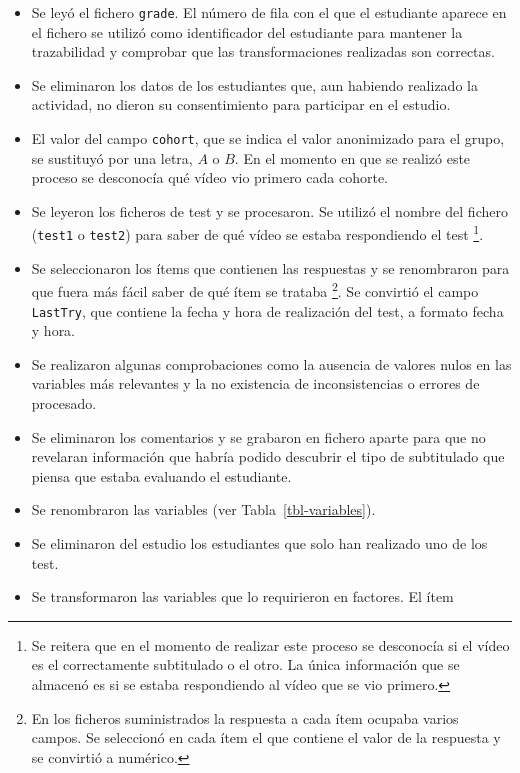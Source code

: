 \documentclass[
  12pt,
  a4paper,
  extrafontsizes,
  onecolumn,
  openright,
  table]{memoir}
\begin{document}
\begin{itemize}
\item
  Se leyó el fichero \texttt{grade}. El número de fila con el que el
  estudiante aparece en el fichero se utilizó como identificador del
  estudiante para mantener la trazabilidad y comprobar que las
  transformaciones realizadas son correctas.
\item
  Se eliminaron los datos de los estudiantes que, aun habiendo realizado
  la actividad, no dieron su consentimiento para participar en el
  estudio.
\item
  El valor del campo \texttt{cohort}, que se indica el valor anonimizado
  para el grupo, se sustituyó por una letra, \(A\) o \(B\). En el
  momento en que se realizó este proceso se desconocía qué vídeo vio
  primero cada cohorte.
\item
  Se leyeron los ficheros de test y se procesaron. Se utilizó el nombre
  del fichero (\texttt{test1} o \texttt{test2}) para saber de qué vídeo
  se estaba respondiendo el test \footnote{Se reitera que en el momento
    de realizar este proceso se desconocía si el vídeo es el
    correctamente subtitulado o el otro. La única información que se
    almacenó es si se estaba respondiendo al vídeo que se vio primero.}.
\item
  Se seleccionaron los ítems que contienen las respuestas y se
  renombraron para que fuera más fácil saber de qué ítem se trataba
  \footnote{En los ficheros suministrados la respuesta a cada ítem
    ocupaba varios campos. Se seleccionó en cada ítem el que contiene el
    valor de la respuesta y se convirtió a numérico.}. Se convirtió el
  campo \texttt{LastTry}, que contiene la fecha y hora de realización
  del test, a formato fecha y hora.
\item
  Se realizaron algunas comprobaciones como la ausencia de valores nulos
  en las variables más relevantes y la no existencia de inconsistencias
  o errores de procesado.
\item
  Se eliminaron los comentarios y se grabaron en fichero aparte para que
  no revelaran información que habría podido descubrir el tipo de
  subtitulado que piensa que estaba evaluando el estudiante.
\item
  Se renombraron las variables (ver Tabla~\ref{tbl-variables}).
\item
  Se eliminaron del estudio los estudiantes que solo han realizado uno
  de los test.
\item
  Se transformaron las variables que lo requirieron en factores. El ítem

\end{itemize}
\end{document}
